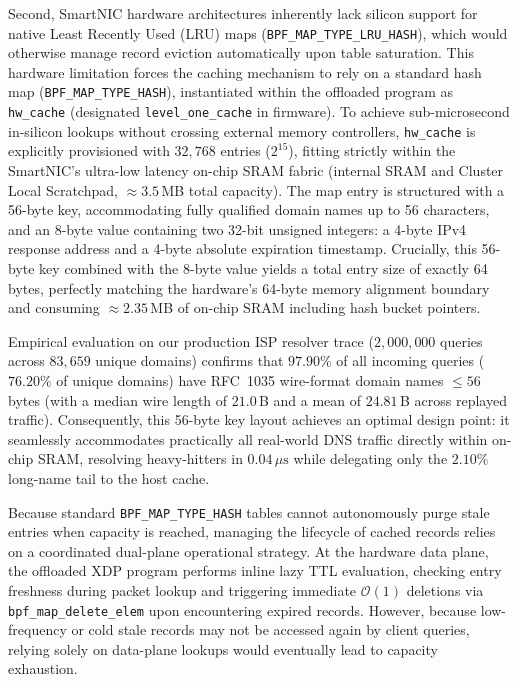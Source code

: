 \documentclass[a4paper,fleqn,colorlinks,hidelinks]{cas-sc}
\begin{document}
Second, SmartNIC hardware architectures inherently lack silicon support for native Least Recently Used (LRU) maps (\texttt{BPF\_MAP\_TYPE\_LRU\_HASH}), which would otherwise manage record eviction automatically upon table saturation. This hardware limitation forces the caching mechanism to rely on a standard hash map (\texttt{BPF\_MAP\_TYPE\_HASH}), instantiated within the offloaded program as \texttt{hw\_cache} (designated \texttt{level\_one\_cache} in firmware). To achieve sub-microsecond in-silicon lookups without crossing external memory controllers, \texttt{hw\_cache} is explicitly provisioned with $32,768$ entries ($2^{15}$), fitting strictly within the SmartNIC's ultra-low latency on-chip SRAM fabric (internal SRAM and Cluster Local Scratchpad, $\approx 3.5$\,MB total capacity). The map entry is structured with a 56-byte key, accommodating fully qualified domain names up to 56 characters, and an 8-byte value containing two 32-bit unsigned integers: a 4-byte IPv4 response address and a 4-byte absolute expiration timestamp. Crucially, this 56-byte key combined with the 8-byte value yields a total entry size of exactly 64 bytes, perfectly matching the hardware's 64-byte memory alignment boundary and consuming $\approx 2.35$\,MB of on-chip SRAM including hash bucket pointers.

Empirical evaluation on our production ISP resolver trace ($2{,}000{,}000$ queries across $83{,}659$ unique domains) confirms that $97.90\%$ of all incoming queries ($76.20\%$ of unique domains) have RFC~1035 wire-format domain names $\le 56$ bytes (with a median wire length of $21.0$\,B and a mean of $24.81$\,B across replayed traffic). Consequently, this 56-byte key layout achieves an optimal design point: it seamlessly accommodates practically all real-world DNS traffic directly within on-chip SRAM, resolving heavy-hitters in $0.04\,\mu\text{s}$ while delegating only the $2.10\%$ long-name tail to the host cache.

Because standard \texttt{BPF\_MAP\_TYPE\_HASH} tables cannot autonomously purge stale entries when capacity is reached, managing the lifecycle of cached records relies on a coordinated dual-plane operational strategy. At the hardware data plane, the offloaded XDP program performs inline lazy TTL evaluation, checking entry freshness during packet lookup and triggering immediate $\mathcal{O}(1)$ deletions via \texttt{bpf\_map\_delete\_elem} upon encountering expired records. However, because low-frequency or cold stale records may not be accessed again by client queries, relying solely on data-plane lookups would eventually lead to capacity exhaustion. 
\end{document}
